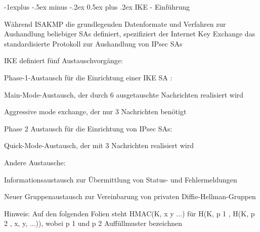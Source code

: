 \documentclass[a4paper]{article}
\makeatletter
\renewcommand{\subsection}{\@startsection{subsection}{2}{0mm}%
 {-1explus -.5ex minus -.2ex}%
 {0.5ex plus .2ex}%
 {\normalfont\normalsize\bfseries}}
\makeatother
\begin{document}
\begin{multicols}{3}
\begin{itemize*}
            \subsection{IKE - Einführung}

            \begin{itemize*}
                  \item
                  Während ISAKMP die grundlegenden Datenformate und Verfahren zur
                  Aushandlung beliebiger SAs definiert, spezifiziert der Internet Key
                  Exchange das standardisierte Protokoll zur Aushandlung von IPsec SAs
                  \item
                  IKE definiert fünf Austauschvorgänge:

                  \begin{itemize*}
                        \item Phase-1-Austausch für die Einrichtung einer IKE SA :
                        \begin{itemize*} \item Main-Mode-Austausch, der durch 6 ausgetauschte Nachrichten realisiert wird \item Aggressive mode exchange, der nur 3 Nachrichten benötigt \end{itemize*}
                        \item Phase 2 Austausch für die Einrichtung von IPsec SAs:
                        \begin{itemize*} \item Quick-Mode-Austausch, der mit 3 Nachrichten realisiert wird \end{itemize*}
                        \item Andere Austausche:
                        \begin{itemize*} \item Informationsaustausch zur Übermittlung von Status- und Fehlermeldungen \item Neuer Gruppenaustausch zur Vereinbarung von privaten Diffie-Hellman-Gruppen \end{itemize*}
                  \end{itemize*}
                  \item
                  Hinweis: Auf den folgenden Folien steht HMAC(K, x \textbar{} y
                  \textbar{} ...) für H(K, p 1 , H(K, p 2 , x, y, ...)), wobei p 1 und p
                  2 Auffüllmuster bezeichnen
            \end{itemize*}



\end{itemize*}
\end{multicols}
\end{document}

